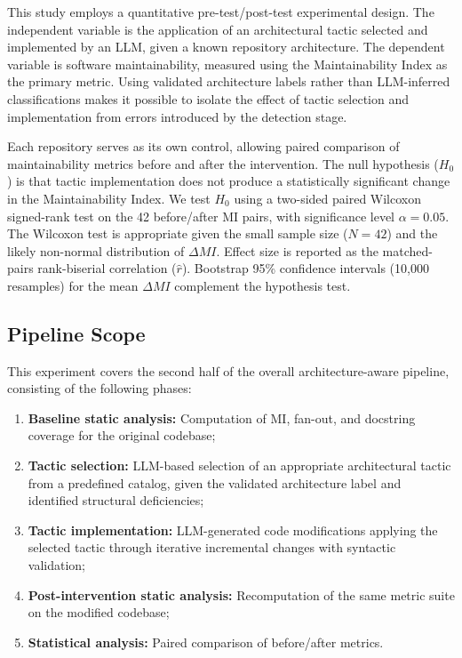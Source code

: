 \documentclass[sigconf,review,anonymous]{acmart}
\begin{document}
This study employs a quantitative pre-test/post-test experimental design. The independent variable is the application of an architectural tactic selected and implemented by an LLM, given a known repository architecture. The dependent variable is software maintainability, measured using the Maintainability Index as the primary metric. Using validated architecture labels rather than LLM-inferred classifications makes it possible to isolate the effect of tactic selection and implementation from errors introduced by the detection stage.

Each repository serves as its own control, allowing paired comparison of maintainability metrics before and after the intervention. The null hypothesis ($H_0$) is that tactic implementation does not produce a statistically significant change in the Maintainability Index. We test $H_0$ using a two-sided paired Wilcoxon signed-rank test on the 42 before/after MI pairs, with significance level $\alpha = 0.05$. The Wilcoxon test is appropriate given the small sample size ($N = 42$) and the likely non-normal distribution of $\Delta MI$. Effect size is reported as the matched-pairs rank-biserial correlation ($\hat{r}$). Bootstrap 95\% confidence intervals (10,000 resamples) for the mean $\Delta MI$ complement the hypothesis test.

\subsection{Pipeline Scope}

This experiment covers the second half of the overall architecture-aware pipeline, consisting of the following phases:

\begin{enumerate}[nosep]
    \item \textbf{Baseline static analysis:} Computation of MI, fan-out, and docstring coverage for the original codebase;
    \item \textbf{Tactic selection:} LLM-based selection of an appropriate architectural tactic from a predefined catalog, given the validated architecture label and identified structural deficiencies;
    \item \textbf{Tactic implementation:} LLM-generated code modifications applying the selected tactic through iterative incremental changes with syntactic validation;
    \item \textbf{Post-intervention static analysis:} Recomputation of the same metric suite on the modified codebase;
    \item \textbf{Statistical analysis:} Paired comparison of before/after metrics.
\end{enumerate}
\end{document}
